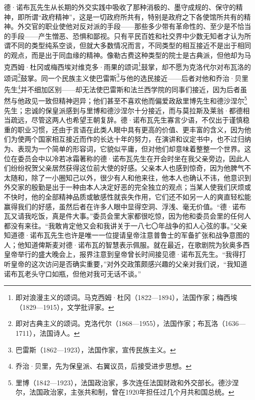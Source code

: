\par 德·诺布瓦先生从长期的外交实践中吸收了那种消极的、墨守成规的、保守的精神，即所谓“政府精神”，这是一切政府所共有，特别是政府之下各使馆所共有的精神。外交官的职业使他对反对派的手段——那些多少带有革命性的、至少是不恰当的手段——产生憎恶、恐惧和鄙视。只有平民百姓和社交界中少数无知者才认为所谓不同的类型纯系空谈，但就大多数情况而言，不同类型的相互接近不是出于相同的观点，而是出于同血缘的精神。像勒古费这种类型的院士是古典派，但他却为马克西姆·杜冈或梅西埃对维克多·雨果的颂词\footnote{即对浪漫主义的颂词。马克西姆·杜冈（1822—1894），法国作家；梅西埃（1829—1915），文学批评家。}鼓掌，却不愿为克洛代尔对布瓦洛的颂词\footnote{即对古典主义的颂词。克洛代尔（1868—1955），法国作家；布瓦洛（1636—1711），法国诗人。}鼓掌。同一个民族主义使巴雷斯\footnote{巴雷斯（1862—1923），法国作家，宣传民族主义。}与他的选民接近——后者对他和乔治·贝里先生\footnote{乔治·贝里，先为保皇派、右翼议员，后接受进步思想。}并不细加区别——却无法使巴雷斯和法兰西学院的同事们接近，因为后者虽然与他政见一致但精神迥异；他们甚至不喜欢他而偏爱政敌里博先生和德沙涅尔\footnote{里博（1842—1923），法国政治家，多次连任法国财政和外交部长。德沙涅尔，法国政治家，主张共和制，曾在1920年担任过几个月共和国总统。}先生；忠诚的保皇派感到与里博和德沙涅尔十分接近，而与莫拉斯及莱翁·都德相当疏远，尽管这两人也希望王朝复辞。德·诺布瓦先生寡言少语，不仅出于谨慎稳重的职业习惯，还由于言语在此类人眼中具有更高的价值、更丰富的含义，因为他们为使两个国家相互接近而作的长达十年的努力，在演讲和议定书中，也不过归纳为、表现为一个简单的形容词，它貌似平庸，但对他们却意味着整整一个世界。这位在委员会中以冷若冰霜著称的德·诺布瓦先生在开会时坐在我父亲旁边，因此人们纷纷祝贺父亲居然获得这位前大使的好感。父亲本人也感到惊奇，因为他脾气不太随和，除了一小圈知己以外，很少有人和他来往，他本人也确认不讳，他意识到外交家的殷勤是出于一种由本人决定好恶的完全独立的观点；当某人使我们厌烦或不快时，他的全部精神品质或敏感性就丧失作用，它们还不如另一人的爽直轻松能赢得我们的好感，虽然后者在许多人眼中显得空洞、浮浅、毫无价值。“德·诺布瓦又请我吃饭，真是件大事。”委员会里大家都很吃惊，因为他和委员会里的任何人都没有来往。“我敢肯定他又会和我讲关于一八七〇年战争的扣人心弦的事。”父亲知道德·诺布瓦先生也许是唯一一位提请皇帝注意普鲁士的军备扩张和战争意图的人；他知道俾斯麦对德·诺布瓦的智慧表示佩服。就在最近，在歌剧院为狄奥多西皇帝举行的盛大晚会上，报界注意到皇帝曾长时间接见德·诺布瓦先生。“我得打听皇帝的这次访问是否确实重要，”对外交政策颇感兴趣的父亲对我们说，“我知道诺布瓦老头守口如瓶，但他对我可无话不谈。”

